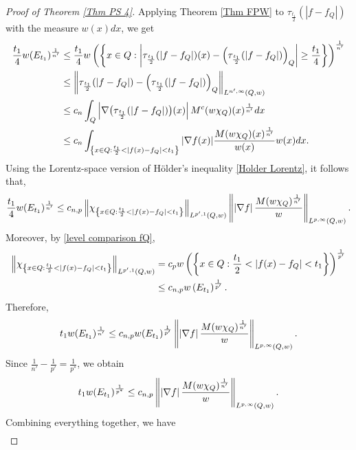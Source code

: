 \documentclass[reqno, 10pt, oneside]{amsart}
\numberwithin{equation}{section}
\newcommand{\strt}[1]{\rule{0pt}{#1}}
\numberwithin{theorem}{section}
\newcommand{\1}{{\rm 1\hspace*{-0.4ex}%
\rule{0.1ex}{1.52ex}\hspace*{0.2ex}}}
\begin{document}
\begin{proof}[Proof of Theorem \ref{Thm PS 4}]
Applying Theorem \ref{Thm FPW} to $\tau_{\frac{t_1}{2}}(|f-f_Q|)$ with the measure $w(x)dx$, we get
\begin{align*}
    \frac{t_1}{4}w(E_{t_1})^\frac{1}{n'}
    &\le \frac{t_1}{4} w\left( \left\{ x\in Q: \left| \tau_{\frac{t_1}{2}}(|f-f_Q|)(x) - \left(\tau_{\frac{t_1}{2}}(|f-f_Q|)\right)_Q \right| \ge \frac{t_1}{4} \right\} \right)^\frac{1}{n'} \\
    &\le \left\| \tau_{\frac{t_1}{2}}(|f-f_Q|) - \left(\tau_{\frac{t_1}{2}}(|f-f_Q|)\right)_Q \right\|_{\strt{2.3ex} L^{n',\infty}(Q, w)} \\
    &\le c_n \int_Q \left|\nabla \big( \tau_{\frac{t_1}{2}}(|f-f_Q|)\big)(x)\right| M^c(w\chi_Q)(x)^\frac{1}{n'}dx \\
    &\le c_n \int_{\left\{x\in Q:\frac{t_1}{2}<|f(x)-f_Q|<t_1\right\}} |\nabla f(x)| \frac{M(w\chi_Q)(x)^\frac{1}{n'}}{w(x)} w(x)dx.
\end{align*}
Using the Lorentz-space version of Hölder's inequality \eqref{Holder Lorentz}, it follows that, 
\begin{equation*}
    \frac{t_1}{4}w(E_{t_1})^\frac{1}{n'} \le c_{n,p} \left\| \chi_{\left\{x\in Q:\frac{t_1}{2}<|f(x)-f_Q|<t_1\right\}} \right\|_{\strt{2.3ex}L^{p',1}(Q,w)} \left\| \left| \nabla f \right| \frac{M(w\chi_Q)^\frac{1}{n'}}{w} \right\|_{\strt{2.3ex}L^{p,\infty}(Q,w)}.
\end{equation*}
Moreover, by \eqref{level comparison fQ}, 
\begin{align*}
    \left\| \chi_{\left\{x\in Q:\frac{t_1}{2}<|f(x)-f_Q|<t_1\right\}} \right\|_{\strt{2.3ex} L^{p',1}(Q,w)}
    &= c_p w\left(\left\{x\in Q:\frac{t_1}{2}<|f(x)-f_Q|<t_1\right\}\right)^\frac{1}{p'} \\
    &\le c_{n,p} w\left(E_{t_1}\right)^\frac{1}{p'}.
\end{align*}
Therefore,
\begin{equation*}
    t_1 w(E_{t_1})^\frac{1}{n'} \le c_{n,p} w(E_{t_1})^\frac{1}{p'} \left\| \left| \nabla f \right| \frac{M(w\chi_Q)^\frac{1}{n'}}{w} \right\|_{\strt{2.3ex} L^{p,\infty}(Q,w)}.
\end{equation*}
Since $\frac{1}{n'}-\frac{1}{p'}=\frac{1}{p^*}$, we obtain
\begin{equation}\label{key level estimate fQ}
    t_1 w(E_{t_1})^\frac{1}{p^*} \le c_{n,p} \left\| \left| \nabla f \right| \frac{M(w\chi_Q)^\frac{1}{n'}}{w} \right\|_{\strt{2.3ex} L^{p,\infty}(Q,w)}.
\end{equation}
Combining everything together, we have
\begin{align*}

\end{align*}
\end{proof}
\end{document}
